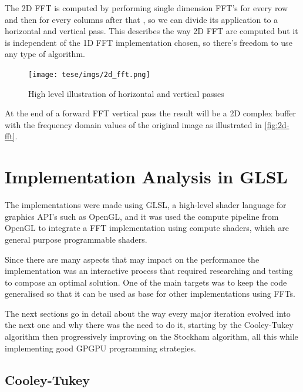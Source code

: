 \documentclass[
  oneside,
  11pt, a4paper,
  footinclude=true,
  headinclude=true,
  cleardoublepage=empty
]{scrbook}
\begin{document}
The 2D FFT is computed by performing single dimension FFT's for every row and then for every columns after that \cite{dudgeon1984multidimensional}, so we can divide its application to a horizontal and vertical pass. This describes the way 2D FFT are computed but it is independent of the 1D FFT implementation chosen, so there's freedom to use any type of algorithm.


\begin{figure}[h]
    \centering
    \texttt{[image: tese/imgs/2d\_fft.png]}
    \caption{High level illustration of horizontal and vertical passes}
    \label{fig:2d-fft}
\end{figure}

At the end of a forward FFT vertical pass the result will be a 2D complex buffer with the frequency domain values of the original image as illustrated in \autoref{fig:2d-fft}.


\section{Implementation Analysis in GLSL}

The implementations were made using GLSL, a high-level shader language for graphics API's such as OpenGL, and it was used the compute pipeline from OpenGL to integrate a FFT implementation using compute shaders, which are general purpose programmable shaders.

Since there are many aspects that may impact on the performance the implementation was an interactive process that required researching and testing to compose an optimal solution. One of the main targets was to keep the code generalised so that it can be used as base for other implementations using FFTs.
\newline

The next sections go in detail about the way every major iteration evolved into the next one and why there was the need to do it, starting by the Cooley-Tukey algorithm then progressively improving on the Stockham algorithm, all this while implementing good GPGPU programming strategies.


\subsection{Cooley-Tukey}
\end{document}
